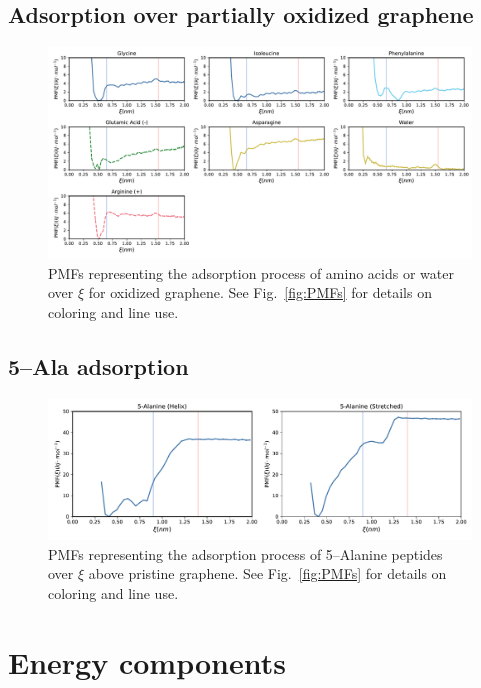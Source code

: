 \documentclass[9pt]{article}
\begin{document}
\newpage
\subsection{Adsorption over partially oxidized graphene}
\begin{figure}[hbtp]
    \centering
    \includegraphics[width=.9\textwidth]{FigS2.pdf}
    \caption{PMFs representing the adsorption process of amino acids or water over $\xi$ for oxidized graphene. See Fig.~\ref{fig:PMFs} for details on coloring and line use.}
    \label{fig:PMFsOX}
\end{figure}

\newpage
\subsection{5--Ala adsorption}
\begin{figure}[hbtp]
    \centering
    \includegraphics[width=.9\textwidth]{FigS3.pdf}
    \caption{PMFs representing the adsorption process of 5--Alanine peptides over $\xi$ above pristine graphene. See Fig.~\ref{fig:PMFs} for details on coloring and line use.}
    \label{fig:PMFs5Ala}
\end{figure}

\newpage
\section{Energy components}
\end{document}
